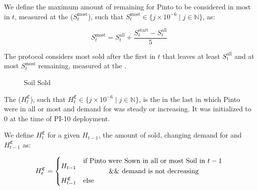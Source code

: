 \documentclass[class=article, crop=false]{standalone}
\begin{document}
\begin{keepunit}
We define the maximum amount of  remaining for Pinto to be considered  in most  in  $t$, measured at the  ($S_t^{\text{most}}$), such that $S_t^{\text{most}} \in \{j \times 10^{-6} \mid j \in \mathbb{N} \}$, as:

    $$
        S_t^{\text{most}} = S_t^{\text{all}} + \frac{S_t^{\text{start}}-S_t^{\text{all}}}{5}
    $$
\end{keepunit}

\begin{keepunit}
The protocol considers most  sold after the first  in  $t$ that leaves at least $S_t^{\text{all}}$ and at most $S_t^{\text{most}}$  remaining, measured at the .

\begin{figure}[H]
    \centering
    
    \vspace*{-7mm}
    \caption{Soil Sold}
    \label{Soil Sold}
\end{figure}
\end{keepunit}

The  ($H_t^{\mathfrak{C}}$), such that $H_t^{\mathfrak{C}} \in \{j \times 10^{-6} \mid j \in \mathbb{N} \}$, is the  in the last  in which Pinto were  in all or most  and demand for  was steady or increasing. It was initialized to $0$ at the time of PI-10 deployment.

\begin{keepunit}
We define $H_t^{\mathfrak{C}}$ for a given $H_{t-1}$, the amount of  sold, changing demand for  and $H_{t-1}^{\mathfrak{C}}$ as:

    $$
        H_t^{\mathfrak{C}} =
        \begin{cases}
            H_{t-1} & \begin{gathered}\text{if Pinto were Sown in all or most Soil in }t-1\\\mkern6mu \&\& \mkern6mu\text{demand is not decreasing}\end{gathered}\\
            H_{t-1}^{\mathfrak{C}} & \text{else}
        \end{cases}
    $$
\end{keepunit}
\end{document}
